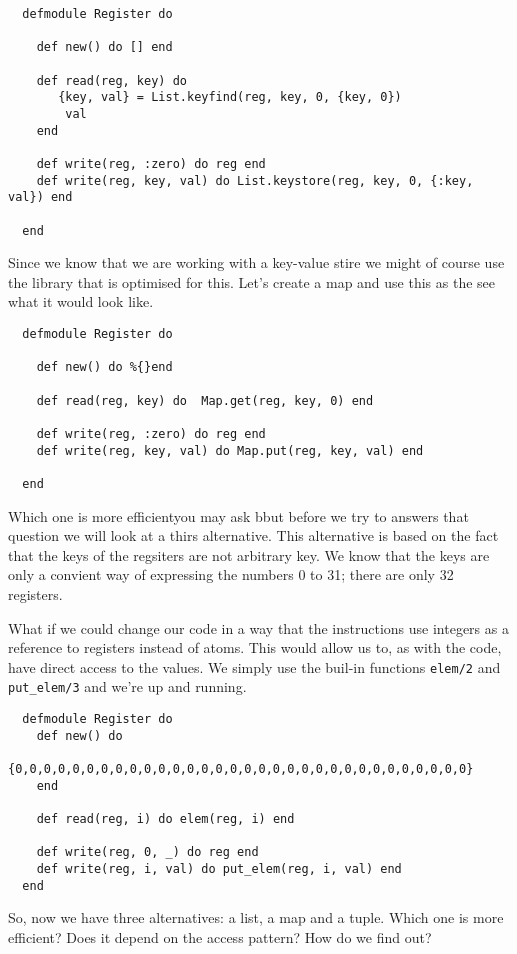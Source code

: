 \documentclass[a4paper,11pt]{article}
\begin{document}
\begin{verbatim}
  defmodule Register do

    def new() do [] end

    def read(reg, key) do
       {key, val} = List.keyfind(reg, key, 0, {key, 0})
        val
    end

    def write(reg, :zero) do reg end
    def write(reg, key, val) do List.keystore(reg, key, 0, {:key, val}) end

  end
\end{verbatim}

Since we know that we are working with a key-value stire we might of
course use the library that is optimised for this. Let's create a map
and use this as the see what it would look like.

\begin{verbatim}
  defmodule Register do

    def new() do %{}end

    def read(reg, key) do  Map.get(reg, key, 0) end

    def write(reg, :zero) do reg end
    def write(reg, key, val) do Map.put(reg, key, val) end

  end
\end{verbatim}

Which one is more efficientyou may ask bbut before we try to answers
that question we will look at a thirs alternative. This alternative is
based on the fact that the keys of the regsiters are not arbitrary
key. We know that the keys are only a convient way of expressing the
numbers 0 to 31; there are only 32 registers.

What if we could change our code in a way that the instructions use
integers as a reference to registers instead of atoms. This would
allow us to, as with the code, have direct access to the values. We
simply use the buil-in functions {\tt elem/2} and {\tt put\_elem/3} and
we're up and running.

\begin{verbatim}
  defmodule Register do
    def new() do
      {0,0,0,0,0,0,0,0,0,0,0,0,0,0,0,0,0,0,0,0,0,0,0,0,0,0,0,0,0,0,0,0}
    end
  
    def read(reg, i) do elem(reg, i) end

    def write(reg, 0, _) do reg end
    def write(reg, i, val) do put_elem(reg, i, val) end  
  end
\end{verbatim}

So, now we have three alternatives: a list, a map and a tuple. Which
one is more efficient? Does it depend on the access pattern? How do we find out?
\end{document}
